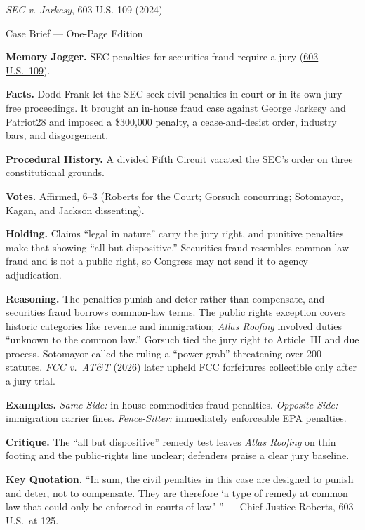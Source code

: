 \documentclass[12pt]{article}
\begin{document}
\begin{center}
{\Large \textit{SEC v. Jarkesy}, 603 U.S. 109 (2024)\par}
\vspace{0.3em}
{\normalsize Case Brief --- One-Page Edition\par}
\end{center}

\textbf{Memory Jogger.} SEC penalties for securities fraud require a jury (\href{https://supreme.justia.com/cases/federal/us/603/22-859/}{603 U.S.\ 109}).

\textbf{Facts.} Dodd-Frank let the SEC seek civil penalties in court or in its own jury-free proceedings. It brought an in-house fraud case against George Jarkesy and Patriot28 and imposed a \$300,000 penalty, a cease-and-desist order, industry bars, and disgorgement.

\textbf{Procedural History.} A divided Fifth Circuit vacated the SEC's order on three constitutional grounds.

\textbf{Votes.} Affirmed, 6--3 (Roberts for the Court; Gorsuch concurring; Sotomayor, Kagan, and Jackson dissenting).

\textbf{Holding.} Claims ``legal in nature'' carry the jury right, and punitive penalties make that showing ``all but dispositive.'' Securities fraud resembles common-law fraud and is not a public right, so Congress may not send it to agency adjudication.

\textbf{Reasoning.} The penalties punish and deter rather than compensate, and securities fraud borrows common-law terms. The public rights exception covers historic categories like revenue and immigration; \textit{Atlas Roofing} involved duties ``unknown to the common law.'' Gorsuch tied the jury right to Article~III and due process. Sotomayor called the ruling a ``power grab'' threatening over 200 statutes. \textit{FCC v.\ AT\&T} (2026) later upheld FCC forfeitures collectible only after a jury trial.

\textbf{Examples.} \emph{Same-Side:} in-house commodities-fraud penalties. \emph{Opposite-Side:} immigration carrier fines. \emph{Fence-Sitter:} immediately enforceable EPA penalties.

\textbf{Critique.} The ``all but dispositive'' remedy test leaves \textit{Atlas Roofing} on thin footing and the public-rights line unclear; defenders praise a clear jury baseline.

\textbf{Key Quotation.} ``In sum, the civil penalties in this case are designed to punish and deter, not to compensate. They are therefore `a type of remedy at common law that could only be enforced in courts of law.' '' --- Chief Justice Roberts, 603 U.S.\ at 125.
\end{document}
